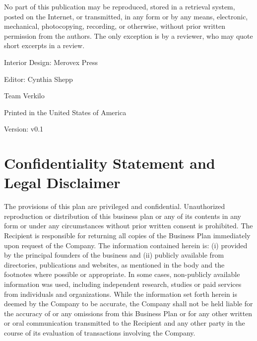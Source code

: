 \documentclass[10pt,openany]{book}
\begin{document}
  \footnotesize
  \par\noindent No part of this publication may be reproduced, stored in
a retrieval system, posted on the Internet, or transmitted, in any form
or by any means, electronic, mechanical, photocopying, recording, or
otherwise, without prior written permission from the authors. The only
exception is by a reviewer, who may quote short excerpts in a
review.\newline


  \footnotesize
  

  \par\noindent Interior Design: Merovex Press %
      \par\noindent Editor: Cynthia Shepp
  \newline

  \par\noindent       \par\noindent Team Verkilo
    \newline

  
  \par\noindent Printed in the United States of America
  \newline

  
    \par\noindent Version: v0.1
    \vspace*{\fill}
  \clearpage\normalsize

      \section*{Confidentiality Statement and Legal Disclaimer}

      The provisions of this plan are privileged and confidential.
      Unauthorized reproduction or distribution of this business plan or
      any of its contents in any form or under any circumstances without
      prior written consent is prohibited. The Recipient is responsible
      for returning all copies of the Business Plan immediately upon
      request of the Company. The information contained herein is: (i)
      provided by the principal founders of the business and (ii)
      publicly available from directories, publications and websites, as
      mentioned in the body and the footnotes where possible or
      appropriate. In some cases, non-publicly available information was
      used, including independent research, studies or paid services
      from individuals and organizations. While the information set
      forth herein is deemed by the Company to be accurate, the Company
      shall not be held liable for the accuracy of or any omissions from
      this Business Plan or for any other written or oral communication
      transmitted to the Recipient and any other party in the course of
      its evaluation of transactions involving the Company.
\end{document}

